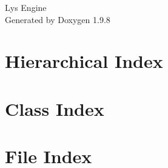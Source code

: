 \documentclass[twoside]{book}
\newcommand{\+}{\discretionary{\mbox{\scriptsize$\hookleftarrow$}}{}{}}
\newcommand{\clearemptydoublepage}{%
    \newpage{\pagestyle{empty}\cleardoublepage}%
  }
\begin{document}
  \raggedbottom
    \hypersetup{pageanchor=false,
                bookmarksnumbered=true,
                pdfencoding=unicode
               }
  \begin{titlepage}
  \vspace*{7cm}
  \begin{center}%
  {\Large Lys Engine}\\
  \vspace*{1cm}
  {\large Generated by Doxygen 1.9.8}\\
  \end{center}
  \end{titlepage}
  \clearemptydoublepage
  \tableofcontents
  \clearemptydoublepage
  \hypersetup{pageanchor=true}
\chapter{Hierarchical Index}

\chapter{Class Index}

\chapter{File Index}

\end{document}
